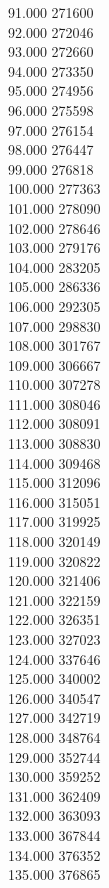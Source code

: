 { 91.000	271600 \\
 92.000	272046 \\
 93.000	272660 \\
 94.000	273350 \\
 95.000	274956 \\
 96.000	275598 \\
 97.000	276154 \\
 98.000	276447 \\
 99.000	276818 \\
 100.000	277363 \\
 101.000	278090 \\
 102.000	278646 \\
 103.000	279176 \\
 104.000	283205 \\
 105.000	286336 \\
 106.000	292305 \\
 107.000	298830 \\
 108.000	301767 \\
 109.000	306667 \\
 110.000	307278 \\
 111.000	308046 \\
 112.000	308091 \\
 113.000	308830 \\
 114.000	309468 \\
 115.000	312096 \\
 116.000	315051 \\
 117.000	319925 \\
 118.000	320149 \\
 119.000	320822 \\
 120.000	321406 \\
 121.000	322159 \\
 122.000	326351 \\
 123.000	327023 \\
 124.000	337646 \\
 125.000	340002 \\
 126.000	340547 \\
 127.000	342719 \\
 128.000	348764 \\
 129.000	352744 \\
 130.000	359252 \\
 131.000	362409 \\
 132.000	363093 \\
 133.000	367844 \\
 134.000	376352 \\
 135.000	376865 \\
}

